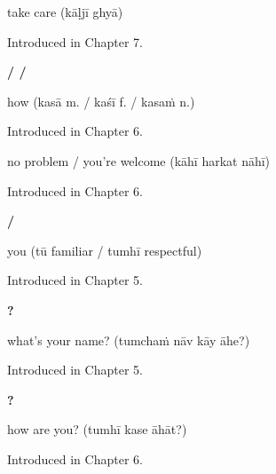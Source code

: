 \noindent\begin{minipage}[t]{\linewidth}
\raggedright
\textbf{ }\par
\small take care (kāḷjī ghyā)\par
\footnotesize Introduced in Chapter 7.
\end{minipage}\par\medskip

\noindent\begin{minipage}[t]{\linewidth}
\raggedright
\textbf{ /  / }\par
\small how (kasā m. / kaśī f. / kasaṁ n.)\par
\footnotesize Introduced in Chapter 6.
\end{minipage}\par\medskip

\noindent\begin{minipage}[t]{\linewidth}
\raggedright
\textbf{  }\par
\small no problem / you're welcome (kāhī harkat nāhī)\par
\footnotesize Introduced in Chapter 6.
\end{minipage}\par\medskip

\noindent\begin{minipage}[t]{\linewidth}
\raggedright
\textbf{ / }\par
\small you (tū familiar / tumhī respectful)\par
\footnotesize Introduced in Chapter 5.
\end{minipage}\par\medskip

\noindent\begin{minipage}[t]{\linewidth}
\raggedright
\textbf{   ?}\par
\small what's your name? (tumchaṁ nāv kāy āhe?)\par
\footnotesize Introduced in Chapter 5.
\end{minipage}\par\medskip

\noindent\begin{minipage}[t]{\linewidth}
\raggedright
\textbf{  ?}\par
\small how are you? (tumhī kase āhāt?)\par
\footnotesize Introduced in Chapter 6.
\end{minipage}\par\medskip

